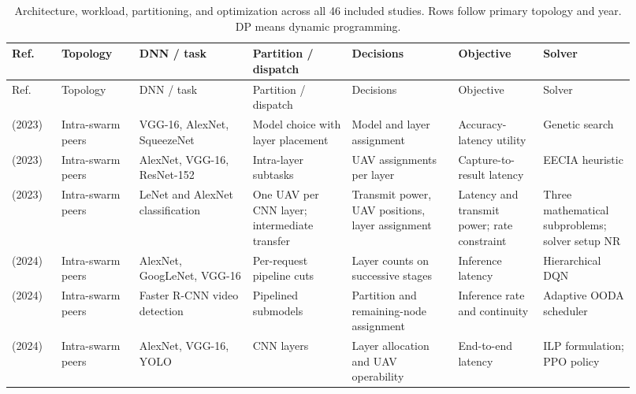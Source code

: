 \begingroup\fontsize{8}{10}\selectfont\setlength{\tabcolsep}{2.5pt}\renewcommand{\arraystretch}{1.17}
\begin{longtable}{@{}Y{0.075\linewidth}Y{0.111\linewidth}Y{0.169\linewidth}Y{0.145\linewidth}Y{0.151\linewidth}Y{0.125\linewidth}Y{0.139\linewidth}@{}}
\caption{Architecture, workload, partitioning, and optimization across all 46 included studies. Rows follow primary topology and year. DP means dynamic programming.}\label{tab:architecture} \\
\toprule
Ref. & Topology & DNN / task & Partition / dispatch & Decisions & Objective & Solver \\
\midrule
\endfirsthead
\toprule
Ref. & Topology & DNN / task & Partition / dispatch & Decisions & Objective & Solver \\
\midrule
\endhead
\midrule
\endfoot
\bottomrule
\endlastfoot
\cite{R0003}\newline\mbox{(2023)} & Intra-swarm peers & VGG-16, AlexNet, SqueezeNet & Model choice with layer placement & Model and layer assignment & Accuracy-latency utility & Genetic search \\
\cite{R0015}\newline\mbox{(2023)} & Intra-swarm peers & AlexNet, VGG-16, ResNet-152 & Intra-layer subtasks & UAV assignments per layer & Capture-to-result latency & EECIA heuristic \\
\cite{R0082}\newline\mbox{(2023)} & Intra-swarm peers & LeNet and AlexNet classification & One UAV per CNN layer; intermediate transfer & Transmit power, UAV positions, layer assignment & Latency and transmit power; rate constraint & Three mathematical subproblems; solver setup NR \\
\cite{R0010}\newline\mbox{(2024)} & Intra-swarm peers & AlexNet, GoogLeNet, VGG-16 & Per-request pipeline cuts & Layer counts on successive stages & Inference latency & Hierarchical DQN \\
\cite{R0062}\newline\mbox{(2024)} & Intra-swarm peers & Faster R-CNN video detection & Pipelined submodels & Partition and remaining-node assignment & Inference rate and continuity & Adaptive OODA scheduler \\
\cite{R0073}\newline\mbox{(2024)} & Intra-swarm peers & AlexNet, VGG-16, YOLO & CNN layers & Layer allocation and UAV operability & End-to-end latency & ILP formulation; PPO policy \\

\end{longtable}
